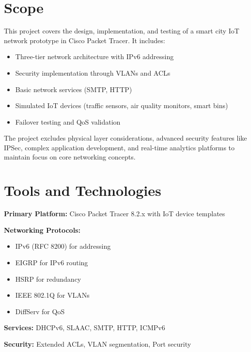 \documentclass[12pt,a4paper]{article}
\begin{document}
\section*{Scope}
{}
This project covers the design, implementation, and testing of a smart city IoT network prototype in Cisco Packet Tracer. It includes:
\begin{itemize}[nosep]
    \item Three-tier network architecture with IPv6 addressing
    \item Security implementation through VLANs and ACLs
    \item Basic network services (SMTP, HTTP)
    \item Simulated IoT devices (traffic sensors, air quality monitors, smart bins)
    \item Failover testing and QoS validation
\end{itemize}

The project excludes physical layer considerations, advanced security features like IPSec, complex application development, and real-time analytics platforms to maintain focus on core networking concepts.

\section*{Tools and Technologies}
{}
\textbf{Primary Platform:} Cisco Packet Tracer 8.2.x with IoT device templates

\textbf{Networking Protocols:}
\begin{itemize}[nosep]
    \item IPv6 (RFC 8200) for addressing
    \item EIGRP for IPv6 routing
    \item HSRP for redundancy
    \item IEEE 802.1Q for VLANs
    \item DiffServ for QoS
\end{itemize}

\textbf{Services:} DHCPv6, SLAAC, SMTP, HTTP, ICMPv6

\textbf{Security:} Extended ACLs, VLAN segmentation, Port security
\end{document}
